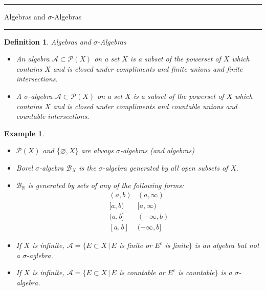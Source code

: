 \documentclass[12pt]{Qual}
\newtheorem{example}{Example}
\newtheorem{definition}{Definition}
\begin{document}
\vspace{0.5cm}
\newpage













\begin{center}
\noindent\textcolor{blue!60!black}{\rule{15cm}{1mm}}
\Huge \faBug\faPuzzlePiece\faCoffee Algebras and $\sigma$-Algebras \faCoffee\faPuzzlePiece\faBug
\vspace{-0.5cm}
\noindent\textcolor{blue!60!black}{\rule{15cm}{1mm}}
\end{center}
\begin{definition}{\Large\textit{Algebras and $\sigma$-Algebras}}

\begin{itemize}
\renewcommand\labelitemi{\faCoffee}
    \item An \textit{algebra} $\mathscr{A}\subset\mathscr{P}(X)$ on a set $X$ is a subset of the powerset of $X$ which contains $X$ and is closed under compliments and \textit{finite} unions and \textit{finite} intersections.
    \item A $\sigma$-algebra  $\mathscr{A}\subset\mathscr{P}(X)$ on a set $X$ is a subset of the powerset of $X$ which contains $X$ and is closed under compliments and \textit{countable} unions and \textit{countable} intersections.
\end{itemize}

\end{definition}
\vspace{0.25cm}
\begin{example}
$\,$
\begin{itemize}
\renewcommand\labelitemi{\faBug}
    \item $\mathscr{P}(X)$ and $\{\varnothing,X\}$ are always $\sigma$-algebras (and algebras)
    \item Borel $\sigma$-algebra $\mathscr{B}_X$ is the $\sigma$-algebra generated by all open subsets of $X.$
    \item $\mathscr{B}_\mathbb{R}$ is generated by sets of any of the following forms: $$\begin{matrix}
    (a,b) & (a,\infty)\\
    [a,b) & [a,\infty)\\
    (a,b] & (-\infty,b)\\
    [a,b] & (-\infty,b]
    \end{matrix}$$
    \item If $X$ is infinite, $\mathscr{A}=\{E\subset X\,|\, E$ is finite or $E^c$ is finite$\}$ is an algebra but \textit{not} a $\sigma$-aglebra.
    \item If $X$ is infinite, $\mathscr{A}=\{E\subset X\,|\, E$ is countable or $E^c$ is countable$\}$ \textit{is} a $\sigma$-algebra.
\end{itemize}
\end{example}
\end{document}
